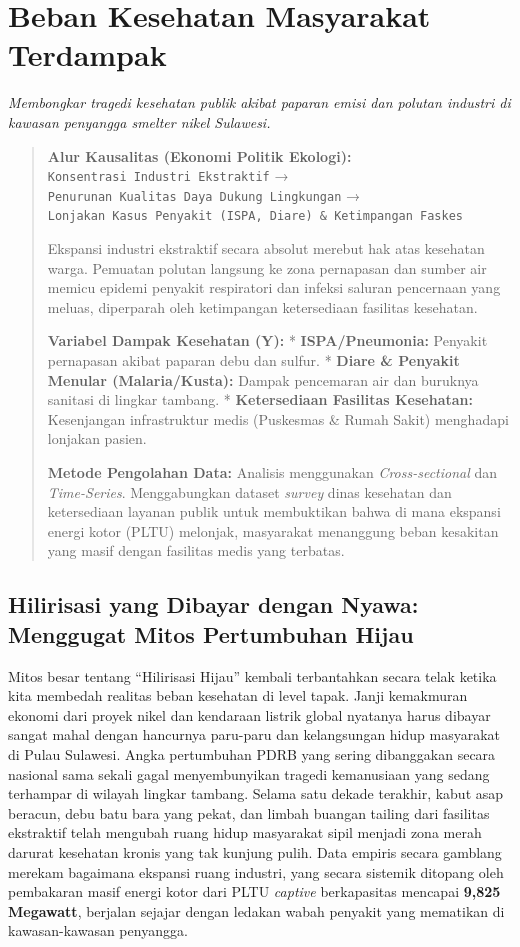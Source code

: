 \documentclass[
]{article}
\author{}
\date{}
\begin{document}
\section{Beban Kesehatan Masyarakat
Terdampak}\label{beban-kesehatan-masyarakat-terdampak}

\emph{Membongkar tragedi kesehatan publik akibat paparan emisi dan
polutan industri di kawasan penyangga smelter nikel Sulawesi.}

\begin{quote}
\textbf{Alur Kausalitas (Ekonomi Politik Ekologi):}
\texttt{Konsentrasi\ Industri\ Ekstraktif} →
\texttt{Penurunan\ Kualitas\ Daya\ Dukung\ Lingkungan} →
\texttt{Lonjakan\ Kasus\ Penyakit\ (ISPA,\ Diare)\ \&\ Ketimpangan\ Faskes}

Ekspansi industri ekstraktif secara absolut merebut hak atas kesehatan
warga. Pemuatan polutan langsung ke zona pernapasan dan sumber air
memicu epidemi penyakit respiratori dan infeksi saluran pencernaan yang
meluas, diperparah oleh ketimpangan ketersediaan fasilitas kesehatan.

\textbf{Variabel Dampak Kesehatan (Y):} * \textbf{ISPA/Pneumonia:}
Penyakit pernapasan akibat paparan debu dan sulfur. * \textbf{Diare \&
Penyakit Menular (Malaria/Kusta):} Dampak pencemaran air dan buruknya
sanitasi di lingkar tambang. * \textbf{Ketersediaan Fasilitas
Kesehatan:} Kesenjangan infrastruktur medis (Puskesmas \& Rumah Sakit)
menghadapi lonjakan pasien.

\textbf{Metode Pengolahan Data:} Analisis menggunakan
\emph{Cross-sectional} dan \emph{Time-Series}. Menggabungkan dataset
\emph{survey} dinas kesehatan dan ketersediaan layanan publik untuk
membuktikan bahwa di mana ekspansi energi kotor (PLTU) melonjak,
masyarakat menanggung beban kesakitan yang masif dengan fasilitas medis
yang terbatas.
\end{quote}

\subsection{Hilirisasi yang Dibayar dengan Nyawa: Menggugat Mitos
Pertumbuhan
Hijau}\label{hilirisasi-yang-dibayar-dengan-nyawa-menggugat-mitos-pertumbuhan-hijau}

Mitos besar tentang ``Hilirisasi Hijau'' kembali terbantahkan secara
telak ketika kita membedah realitas beban kesehatan di level tapak.
Janji kemakmuran ekonomi dari proyek nikel dan kendaraan listrik global
nyatanya harus dibayar sangat mahal dengan hancurnya paru-paru dan
kelangsungan hidup masyarakat di Pulau Sulawesi. Angka pertumbuhan PDRB
yang sering dibanggakan secara nasional sama sekali gagal menyembunyikan
tragedi kemanusiaan yang sedang terhampar di wilayah lingkar tambang.
Selama satu dekade terakhir, kabut asap beracun, debu batu bara yang
pekat, dan limbah buangan tailing dari fasilitas ekstraktif telah
mengubah ruang hidup masyarakat sipil menjadi zona merah darurat
kesehatan kronis yang tak kunjung pulih. Data empiris secara gamblang
merekam bagaimana ekspansi ruang industri, yang secara sistemik ditopang
oleh pembakaran masif energi kotor dari PLTU \emph{captive} berkapasitas
mencapai \textbf{9,825 Megawatt}, berjalan sejajar dengan ledakan wabah
penyakit yang mematikan di kawasan-kawasan penyangga.
\end{document}
